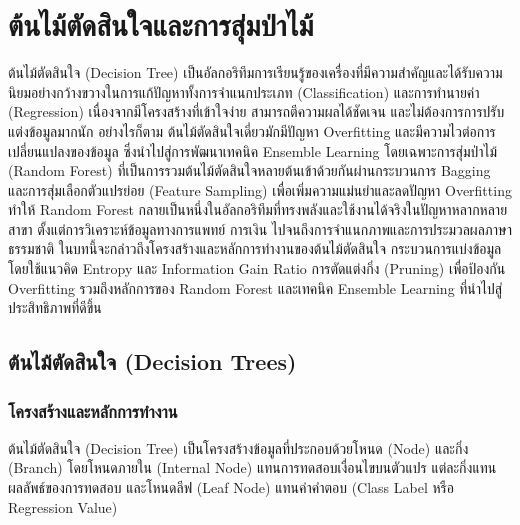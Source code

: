 \chapter{ต้นไม้ตัดสินใจและการสุ่มป่าไม้}
ต้นไม้ตัดสินใจ (Decision Tree) เป็นอัลกอริทึมการเรียนรู้ของเครื่องที่มีความสำคัญและได้รับความนิยมอย่างกว้างขวางในการแก้ปัญหาทั้งการจำแนกประเภท (Classification) และการทำนายค่า (Regression) เนื่องจากมีโครงสร้างที่เข้าใจง่าย สามารถตีความผลได้ชัดเจน และไม่ต้องการการปรับแต่งข้อมูลมากนัก อย่างไรก็ตาม ต้นไม้ตัดสินใจเดี่ยวมักมีปัญหา Overfitting และมีความไวต่อการเปลี่ยนแปลงของข้อมูล ซึ่งนำไปสู่การพัฒนาเทคนิค Ensemble Learning โดยเฉพาะการสุ่มป่าไม้ (Random Forest) ที่เป็นการรวมต้นไม้ตัดสินใจหลายต้นเข้าด้วยกันผ่านกระบวนการ Bagging และการสุ่มเลือกตัวแปรย่อย (Feature Sampling) เพื่อเพิ่มความแม่นยำและลดปัญหา Overfitting ทำให้ Random Forest กลายเป็นหนึ่งในอัลกอริทึมที่ทรงพลังและใช้งานได้จริงในปัญหาหลากหลายสาขา ตั้งแต่การวิเคราะห์ข้อมูลทางการแพทย์ การเงิน ไปจนถึงการจำแนกภาพและการประมวลผลภาษาธรรมชาติ ในบทนี้จะกล่าวถึงโครงสร้างและหลักการทำงานของต้นไม้ตัดสินใจ กระบวนการแบ่งข้อมูลโดยใช้แนวคิด Entropy และ Information Gain Ratio การตัดแต่งกิ่ง (Pruning) เพื่อป้องกัน Overfitting รวมถึงหลักการของ Random Forest และเทคนิค Ensemble Learning ที่นำไปสู่ประสิทธิภาพที่ดีขึ้น


\section{ต้นไม้ตัดสินใจ (Decision Trees)}
\subsection{โครงสร้างและหลักการทำงาน}
ต้นไม้ตัดสินใจ (Decision Tree) เป็นโครงสร้างข้อมูลที่ประกอบด้วยโหนด (Node) และกิ่ง (Branch) โดยโหนดภายใน (Internal Node) แทนการทดสอบเงื่อนไขบนตัวแปร แต่ละกิ่งแทนผลลัพธ์ของการทดสอบ และโหนดลีฟ (Leaf Node) แทนค่าคำตอบ (Class Label หรือ Regression Value)


